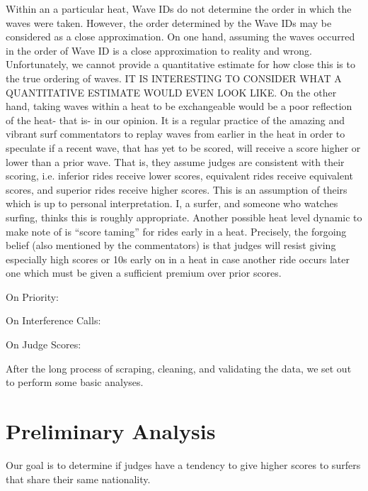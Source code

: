 \documentclass{article}
\begin{document}
Within an a particular heat, Wave IDs do not determine the order in which the waves were taken. However, the order determined by the Wave IDs may be considered as a close approximation. On one hand, assuming the waves occurred in the order of Wave ID is a close approximation to reality and wrong. Unfortunately, we cannot provide a quantitative estimate for how close this is to the true ordering of waves. 
	IT IS INTERESTING TO CONSIDER WHAT A QUANTITATIVE ESTIMATE WOULD EVEN LOOK LIKE.
On the other hand, taking waves within a heat to be exchangeable would be a poor reflection of the heat- that is- in our opinion. It is a regular practice of the amazing and vibrant surf commentators to replay waves from earlier in the heat in order to speculate if a recent wave, that has yet to be scored, will receive a score higher or lower than a prior wave. That is, they assume judges are consistent with their scoring, i.e. inferior rides receive lower scores, equivalent rides receive equivalent scores, and superior rides receive higher scores.
This is an assumption of theirs which is up to personal interpretation. I, a surfer, and someone who watches surfing, thinks this is roughly appropriate. Another possible heat level dynamic to make note of is “score taming” for rides early in a heat. Precisely, the forgoing belief (also mentioned by the commentators) is that judges will resist giving especially high scores or 10s early on in a heat in case another ride occurs later one which must be given a sufficient premium over prior scores.

On Priority:

On Interference Calls:

On Judge Scores:

After the long process of scraping, cleaning, and validating the data, we set out to perform some basic analyses.

\section{Preliminary Analysis}
Our goal is to determine if judges have a tendency to give higher scores to surfers that share their same nationality.
\end{document}
